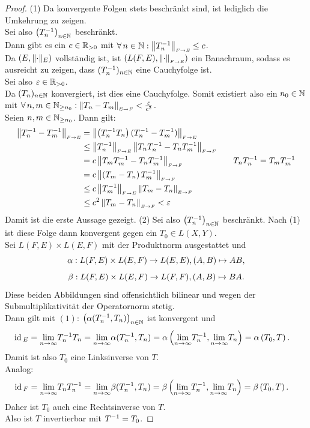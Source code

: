 \begin{proof} (1) Da konvergente Folgen stets beschränkt sind, ist lediglich
die Umkehrung zu zeigen.\\
Sei also $\left(T_n^{-1}\right)_{n \in \mathbb{N}}$ beschränkt.\\
Dann gibt es ein $c \in \mathbb{R}_{>0}$ mit
$\forall\, n \in \mathbb{N}: \left\|T_n^{-1}\right\|_{\scriptscriptstyle{F \rightarrow E}} \le c$.\\
Da $(E, \lVert\cdot\rVert_E)$ vollständig ist, ist $(L(F, E), \left\|\cdot\right\|_{\scriptscriptstyle{F \rightarrow E}})$ 
ein Banachraum, sodass es ausreicht zu zeigen, dass $(T^{-1}_{n})_{n \in \mathbb{N}}$ eine
Cauchyfolge ist.\\
Sei also $\varepsilon \in \mathbb{R}_{>0}$.\\
Da $(T_{n})_{n \in \mathbb{N}}$ konvergiert, ist dies eine Cauchyfolge. Somit existiert also
ein $n_0 \in \mathbb{N}$ mit
$\forall\, n, m \in \mathbb{N}_{\ge n_0}: \left\|T_n - T_m\right\|_{\scriptscriptstyle{E \rightarrow F}} < \frac {\varepsilon} {c^2}$.\\
Seien $n, m \in \mathbb{N}_{\ge n_0}$. Dann gilt:
\begin{align*}
\left\|T_n^{-1} - T_m^{-1}\right\|_{\scriptscriptstyle{F \rightarrow E}} 
 & = \left\|\left(T_n^{-1} T_n \right)(T_n^{-1} - T_m^{-1})\right\|_{\scriptscriptstyle{F \rightarrow E}}\\
   &\le \left\|T_n^{-1}\right\|_{\scriptscriptstyle{F \rightarrow E}}\left\|T_nT_n^{-1}-T_nT_m^{-1}\right\|_{\scriptscriptstyle{F \rightarrow F}}\\
   &=c\left\|T_mT_m^{-1} -T_nT_m^{-1}\right\|_{\scriptscriptstyle{F \rightarrow F}} & \quad T_nT_n^{-1} = T_mT_m^{-1}\\
   &=c\left\|\left(T_m -T_n\right)T_m^{-1}\right\|_{\scriptscriptstyle{F \rightarrow F}}\\
   & \le c \left\|T_m^{-1}\right\|_{\scriptscriptstyle{F \rightarrow E}} \left\|T_m - T_n\right\|_{\scriptscriptstyle{E \rightarrow F}}\\
   & \le c^2 \left\|T_m - T_n\right\|_{\scriptscriptstyle{E \rightarrow F}} < \varepsilon
\end{align*}
Damit ist die erste Aussage gezeigt.\absatz
(2) Sei also $\left(T_n^{-1}\right)_{n \in \mathbb{N}}$ beschränkt. Nach (1) ist diese
Folge dann konvergent gegen ein $T_0 \in L(X, Y)$.\\
Sei $L(F,E) \times L(E, F)$ mit der Produktnorm ausgestattet und
\[\alpha : L(F, E) \times L(E, F) \rightarrow L(E, E), (A,B) \mapsto AB\text,\]
\[\beta  : L(F, E) \times L(E, F) \rightarrow L(F, F), (A,B) \mapsto BA\text.\]
Diese beiden Abbildungen sind offensichtlich bilinear und wegen der
Submultiplikativität der Operatornorm stetig.\\
Dann gilt mit $(1)$: $\left( \alpha(T_n^{-1}, T_n)\right)_{n \in \mathbb{N}}$ ist
konvergent und
\begin{align*}
\text{id}\,_E &= \underset{n\to \infty}{\lim} T_n^{-1} T_n = \underset{n\to \infty}{\lim} \alpha (T_n^{-1}, T_n)
      = \alpha\left( \underset{n\to \infty}{\lim} T_n^{-1}, \underset{n\to \infty}{\lim} T_n\right)
      = \alpha\left(T_0, T\right)\text.
\end{align*}
Damit ist also $T_0$ eine Linksinverse von $T$.\\
Analog:
\begin{align*}
\text{id}\,_F & = \underset{n\to \infty}{\lim} T_n T_n^{-1}  = \underset{n\to \infty}{\lim} \beta (T_n^{-1}, T_n)
      = \beta\left( \underset{n\to \infty}{\lim} T_n^{-1}, \underset{n\to \infty}{\lim} T_n\right)
      = \beta\left(T_0, T\right)\text.
\end{align*}
Daher ist $T_0$ auch eine Rechtsinverse von $T$.\\
Also ist $T$ invertierbar mit $T^{-1} = T_0$.
\end{proof}
